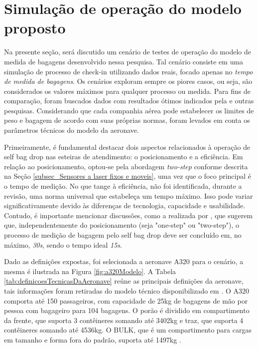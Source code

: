     
\section{Simulação de operação do modelo proposto}
\label{sec_Cenários simulados de operação do produto}

    Na presente seção, será discutido um cenário de testes de operação do modelo de medida de bagagens desenvolvido nessa pesquisa. Tal cenário consiste em uma simulação de processo de check-in utilizando dados reais, focado apenas no \textit{tempo de medida de bagagens}. Os cenários exploram sempre os piores casos, ou seja, são considerados os valores máximos para qualquer processo ou medida. Para fins de comparação, foram buscados dados com resultados ótimos indicados pela  e outras pesquisas. Considerando que cada companhia aérea pode estabelecer os limites de peso e bagagem de acordo com suas próprias normas, foram levados em conta os parâmetros técnicos do modelo da aeronave. 

    Primeiramente, é fundamental destacar dois aspectos relacionados à operação de self bag drop nas esteiras de atendimento: o posicionamento e a eficiência. Em relação ao posicionamento, optou-se pela abordagem \textit{two-step} conforme descrita na Seção \ref{subsec_Sensores a laser fixos e moveis}, uma vez que o foco principal é o tempo de medição. No que tange à eficiência, não foi identificada, durante a revisão, uma norma universal que estabeleça um tempo máximo. Isso pode variar significativamente devido às diferenças de tecnologia, capacidade e usabilidade. Contudo, é importante mencionar discussões, como a realizada por , que sugerem que, independentemente do posicionamento (seja "one-step" ou "two-step"), o processo de medição de bagagem pelo self bag drop deve ser concluído em, no máximo, \textit{30s}, sendo o tempo ideal \textit{15s}.

    Dado as definições expostas, foi selecionada a aeronave A320 para o cenário, a mesma é ilustrada na Figura \ref{fig:a320Modelo}. A Tabela \ref{tab:definicoesTecnicasDaAeronave} reúne as principais definições da aeronave, tais informações foram retiradas do modelo técnico disponibilizado em \cite{anacargo_2023_a320321ana}. O A320 comporta até 150 passageiros, com capacidade de 25kg de bagagens de mão por pessoa com bagageiro para 104 bagagens. O porão é dividido em compartimento da frente, que suporta 3 contêineres somando até 3402kg e traz, que suporta 4 contêineres somando até 4536kg. O BULK, que é um compartimento para cargas em tamanho e forma fora do padrão, suporta até 1497kg \cite{anacargo_2023_a320321ana, airfrance_2019_air}.


